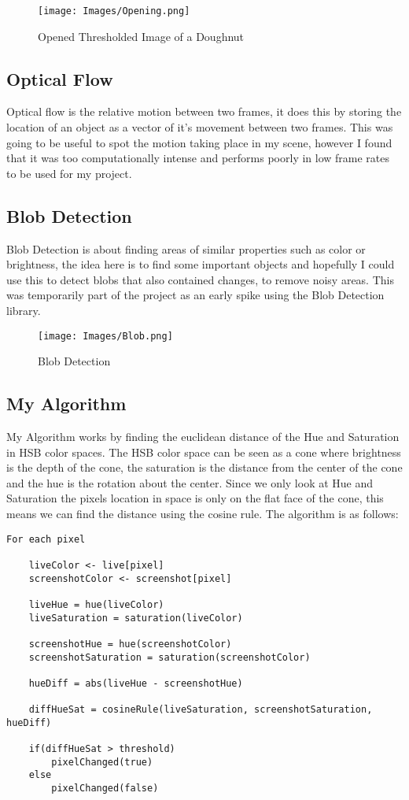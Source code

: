 \documentclass[a4paper]{report}
\begin{document}
\begin{figure}[!ht]
\centering
\texttt{[image: Images/Opening.png]}
\caption{\label{fig:Doughnut} Opened Thresholded Image of a Doughnut}
\end{figure}
\clearpage
\subsection{Optical Flow}
Optical flow is the relative motion between two frames, it does this by storing the location of an object as a vector of it's movement between two frames. This was going to be useful to spot the motion taking place in my scene, however I found that it was too computationally intense and performs poorly in low frame rates to be used for my project.

\subsection{Blob Detection}
Blob Detection is about finding areas of similar properties such as color or brightness, the idea here is to find some important objects and hopefully I could use this to detect blobs that also contained changes, to remove noisy areas. This was temporarily part of the project as an early spike using the Blob Detection library\cite{BLOB}.

\begin{figure}[!ht]
\centering
\texttt{[image: Images/Blob.png]}
\caption{\label{fig:Doughnut} Blob Detection}
\end{figure}

\subsection{My Algorithm}
My Algorithm works by finding the euclidean distance of the Hue and Saturation in HSB color spaces. The HSB color space can be seen as a cone where brightness is the depth of the cone, the saturation is the distance from the center of the cone and the hue is the rotation about the center. Since we only look at Hue and Saturation the pixels location in space is only on the flat face of the cone, this means we can find the distance using the cosine rule. The algorithm is as follows:

\begin{lstlisting}
For each pixel

    liveColor <- live[pixel]
    screenshotColor <- screenshot[pixel]
    
    liveHue = hue(liveColor)
    liveSaturation = saturation(liveColor)
    
    screenshotHue = hue(screenshotColor)
    screenshotSaturation = saturation(screenshotColor)
    
    hueDiff = abs(liveHue - screenshotHue)
    
    diffHueSat = cosineRule(liveSaturation, screenshotSaturation, hueDiff)
    
    if(diffHueSat > threshold)
    	pixelChanged(true)
    else
    	pixelChanged(false)
\end{lstlisting}
\end{document}
